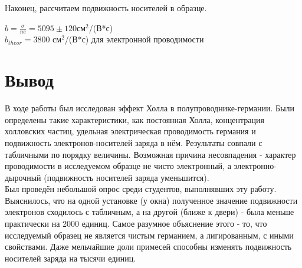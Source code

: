 \documentclass[a4paper]{article}
\begin{document}
 Наконец, рассчитаем подвижность носителей в образце.
 \begin{center}
     $b = \frac{\sigma}{ne} = 5095 \pm 120 $см$^2$/(В*с) \\
     $b_{theor} = 3800$ см$^2$/(В*с) для электронной проводимости
 \end{center}


\section*{Вывод}

В ходе работы был исследован эффект Холла в полупроводнике-германии. Были определены такие характеристики, как постоянная Холла, концентрация холловских частиц, удельная электрическая проводимость германия и подвижность электронов-носителей заряда в нём. Результаты совпали с табличными по порядку величины. Возможная причина несовпадения - характер проводимости в исследуемом образце не чисто электронный, а электронно-дырочный (подвижность носителей заряда уменьшится). \\
Был проведён небольшой опрос среди студентов, выполнявших эту работу. Выяснилось, что на одной установке (у окна) полученное значение подвижности электронов сходилось с табличным, а на другой (ближе к двери) - была меньше практически на 2000 единиц. Самое разумное объяснение этого - то, что исследуемый образец не является чистым германием, а лигированным, с иными свойствами. Даже мельчайшие доли примесей способны изменять подвижность носителей заряда на тысячи единиц.
\end{document}
